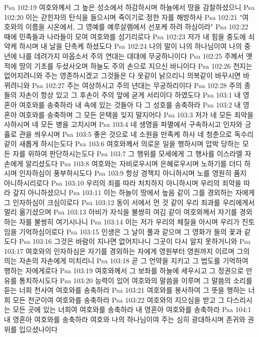 Psa 102:19  여호와께서 그 높은 성소에서 하감하시며 하늘에서 땅을 감찰하셨으니
Psa 102:20  이는 갇힌자의 탄식을 들으시며 죽이기로 정한 자를 해방하사
Psa 102:21  "여호와의 이름을 시온에서, 그 영예를 예루살렘에서 선포케 하려 하심이라"
Psa 102:22  때에 민족들과 나라들이 모여 여호와를 섬기리로다
Psa 102:23  저가 내 힘을 중도에 쇠약케 하시며 내 날을 단촉케 하셨도다
Psa 102:24  나의 말이 나의 하나님이여 나의 중년에 나를 데려가지 마옵소서 주의 연대는 대대에 무궁하니이다
Psa 102:25  주께서 옛적에 땅의 기초를 두셨사오며 하늘도 주의 손으로 지으신 바니이다
Psa 102:26  천지는 없어지려니와 주는 영존하시겠고 그것들은 다 옷같이 낡으리니 의복같이 바꾸시면 바뀌려니와
Psa 102:27  주는 여상하시고 주의 년대는 무궁하리이다
Psa 102:28  주의 종들의 자손이 항상 있고 그 후손이 주의 앞에 굳게 서리이다 하였도다
Psa 103:1  내 영혼아 여호와를 송축하라 내 속에 있는 것들아 다 그 성호를 송축하라
Psa 103:2  내 영혼아 여호와를 송축하며 그 모든 은택을 잊지 말지어다
Psa 103:3  저가 네 모든 죄악을 사하시며 네 모든 병을 고치시며
Psa 103:4  네 생명을 파멸에서 구속하시고 인자와 긍휼로 관을 씌우시며
Psa 103:5  좋은 것으로 네 소원을 만족케 하사 네 청춘으로 독수리 같이 새롭게 하시는도다
Psa 103:6  여호와께서 의로운 일을 행하시며 압박 당하는 모든 자를 위하여 판단하시는도다
Psa 103:7  그 행위를 모세에게 그 행사를 이스라엘 자손에게 알리셨도다
Psa 103:8  여호와는 자비로우시며 은혜로우시며 노하기를 더디 하시며 인자하심이 풍부하시도다
Psa 103:9  항상 경책지 아니하시며 노를 영원히 품지 아니하시리로다
Psa 103:10  우리의 죄를 따라 처치하지 아니하시며 우리의 죄악을 따라 갚지 아니하셨으니
Psa 103:11  이는 하늘이 땅에서 높음 같이 그를 경외하는 자에게 그 인자하심이 크심이로다
Psa 103:12  동이 서에서 먼 것 같이 우리 죄과를 우리에게서 멀리 옮기셨으며
Psa 103:13  아비가 자식을 불쌍히 여김 같이 여호와께서 자기를 경외하는 자를 불쌍히 여기시나니
Psa 103:14  이는 저가 우리의 체질을 아시며 우리가 진토임을 기억하심이로다
Psa 103:15  인생은 그 날이 풀과 같으며 그 영화가 들의 꽃과 같도다
Psa 103:16  그것은 바람이 지나면 없어지나니 그곳이 다시 알지 못하거니와
Psa 103:17  여호와의 인자하심은 자기를 경외하는 자에게 영원부터 영원까지 이르며 그의 의는 자손의 자손에게 미치리니
Psa 103:18  곧 그 언약을 지키고 그 법도를 기억하여 행하는 자에게로다
Psa 103:19  여호와께서 그 보좌를 하늘에 세우시고 그 정권으로 만유를 통치하시도다
Psa 103:20  능력이 있어 여호와의 말씀을 이루며 그 말씀의 소리를 듣는 너희 천사여 여호와를 송축하라
Psa 103:21  여호와를 봉사하여 그 뜻을 행하는 너희 모든 천군이여 여호와를 송축하라
Psa 103:22  여호와의 지으심을 받고 그 다스리시는 모든 곳에 있는 너희여 여호와를 송축하라 내 영혼아 여호와를 송축하라
Psa 104:1  내 영혼아 여호와를 송축하라 여호와 나의 하나님이여 주는 심히 광대하시며 존귀와 권위를 입으셨나이다
